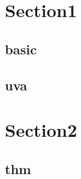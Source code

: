 \section{Section1}
    \subsection{basic}
        
    \subsection{uva}
    	

\section{Section2}
    \subsection{thm}
        
